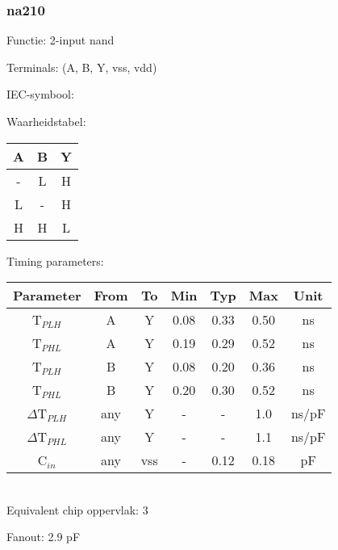 \subsubsection{na210}

Functie: 2-input nand

Terminals: (A, B, Y, vss, vdd)


IEC-symbool:
\begin{figure}[bth]
\end{figure}

\begin{minipage}[t]{0.3\textwidth}
Waarheidstabel:\\

\begin{tabular}{|c|c||c|}
\hline
A	&B	&Y\\
\hline
-	&L	&H\\
L	&-	&H\\
H	&H	&L\\
\hline
\end{tabular}
\end{minipage}
\hfill
\begin{minipage}[t]{0.6\textwidth}
Timing parameters:\\

\begin{tabular}{|c|cc|ccc|c|}
\hline
Parameter               &From            &To	&Min   	&Typ	&Max	&Unit\\
\hline
T$_{PLH}$               &A     		&Y      &0.08	&0.33	&0.50    &ns\\
T$_{PHL}$               &A    		&Y      &0.19	&0.29	&0.52    &ns\\
T$_{PLH}$               &B     		&Y      &0.08	&0.20	&0.36    &ns\\
T$_{PHL}$               &B    		&Y      &0.20	&0.30	&0.52    &ns\\
\hline
$\Delta$T$_{PLH}$       &any          	&Y      &-	&-	&1.0    &ns/pF\\
$\Delta$T$_{PHL}$       &any           	&Y      &-	&-	&1.1    &ns/pF\\
\hline
C$_{in}$                &any	    	&vss    &-	&0.12	&0.18   &pF\\
\hline
\end{tabular}
\end{minipage}
\\

Equivalent chip oppervlak: 3

Fanout: 2.9 pF


\clearpage
